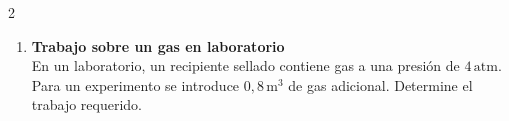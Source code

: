 \documentclass[a4paper,12pt]{article}
\begin{document}
\begin{multicols}{2}
\begin{enumerate}
\vspace{0.3cm}

\item \textbf{Trabajo sobre un gas en laboratorio} \\
En un laboratorio, un recipiente sellado contiene gas a una presión de $4\,\text{atm}$. Para un experimento se introduce $0{,}8\,\text{m}^3$ de gas adicional. Determine el trabajo requerido.

\end{enumerate}

\end{multicols}
\end{document}
